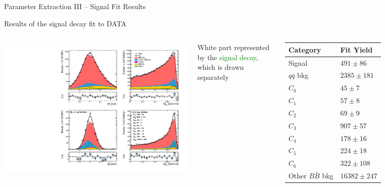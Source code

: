 \documentclass[serif]{beamer}
\begin{document}
\begin{frame}[t]{Parameter Extraction III -- Signal Fit Results}
\vspace{-3mm}
\small

Results of the signal decay fit to DATA
\begin{columns}
	\vspace{-2mm}
	\begin{center}
		\includegraphics[width=\textwidth]{fig/sig_fit_data}
	\end{center}
	
		\vspace{-7mm}
		\begin{block}{}
		White part represented by the \textcolor{green}{signal decay}, which is drawn separately
	\end{block}
\vspace{-4mm}
	\begin{table}[H]
		\centering
		\begin{tabular}{l|l}
			Category & Fit Yield \\
			\toprule
			Signal & $491 \pm 86$ \\
			$q \bar q$ bkg & $ 2385 \pm 181 $ \\
			$C_0$ & $ 45 \pm 7 $ \\
			$C_1$ & $ 57 \pm 8 $\\
			$C_2$ & $ 69 \pm 9 $ \\
			$C_3$ & $ 907 \pm 57 $ \\
			$C_4$ & $ 178 \pm 16 $ \\
			$C_5$ & $ 224 \pm 18 $ \\
			$C_6$ & $ 322 \pm 108 $ \\
			Other $B \bar B$ bkg & $ 16382 \pm 247 $ \\
			\bottomrule
		\end{tabular}
	\end{table}
\end{columns}


\end{frame}
\end{document}
